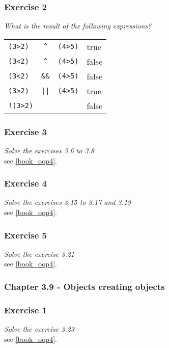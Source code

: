 \subsubsection*{Exercise 2}
\textit{What is the result of the following expressions?}\\

\begin{table}[h!]
	\begin{tabular}{l c l l}
	\lstinline!(3>2)! & \lstinline!^! & \lstinline!(4>5)! & true \\
	\lstinline!(3<2)! & \lstinline!^! & \lstinline!(4>5)! & false \\
	\lstinline!(3<2)! & \lstinline!&&! & \lstinline!(4>5)! & false \\
	\lstinline!(3>2)! & \lstinline!||! & \lstinline!(4>5)! & true \\
	\lstinline?!(3>2)? &  &  & false
	\end{tabular}
\end{table}

\subsubsection*{Exercise 3}
\textit{Solve the exercises 3.6 to 3.8}\\
see \ref{book_oop4}. 

\subsubsection*{Exercise 4}
\textit{Solve the exercises 3.15 to 3.17 and 3.19}\\
see \ref{book_oop4}. 

\subsubsection*{Exercise 5}
\textit{Solve the exercise 3.21}\\
see \ref{book_oop4}. 

\subsubsection{Chapter 3.9 - Objects creating objects}

\subsubsection*{Exercise 1}
\textit{Solve the exercise 3.23}\\
see \ref{book_oop4}. 


